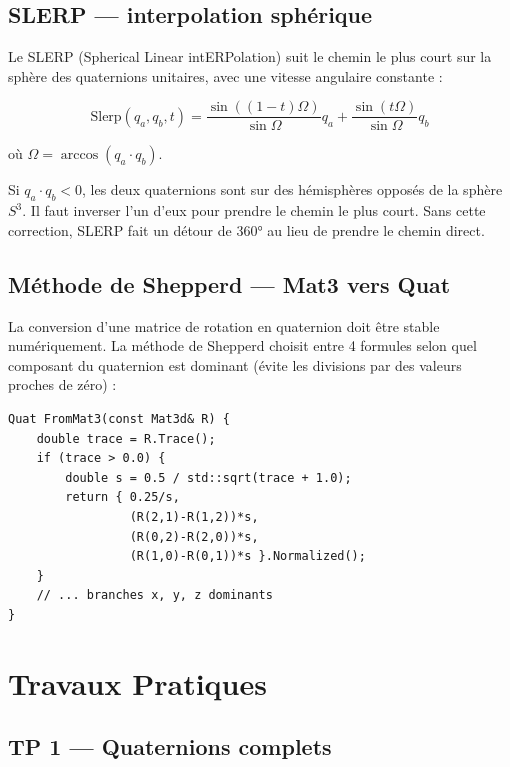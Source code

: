 \documentclass[12pt,a4paper]{report}
\begin{document}
\subsection{SLERP — interpolation sphérique}

Le SLERP (Spherical Linear intERPolation) suit le chemin le plus court sur la sphère des quaternions unitaires, avec une vitesse angulaire constante :

$$
\text{Slerp}(q_a, q_b, t) = \frac{\sin((1-t)\Omega)}{\sin\Omega} q_a + \frac{\sin(t\Omega)}{\sin\Omega} q_b
$$

où $\Omega = \arccos(q_a \cdot q_b)$.

\begin{warnbox}
Si $q_a \cdot q_b < 0$, les deux quaternions sont sur des hémisphères opposés de la sphère $S^3$. Il faut inverser l'un d'eux pour prendre le chemin le plus court. Sans cette correction, SLERP fait un détour de 360° au lieu de prendre le chemin direct.
\end{warnbox}

\subsection{Méthode de Shepperd — Mat3 vers Quat}

La conversion d'une matrice de rotation en quaternion doit être stable numériquement. La méthode de Shepperd choisit entre 4 formules selon quel composant du quaternion est dominant (évite les divisions par des valeurs proches de zéro) :

\begin{lstlisting}[caption={Méthode de Shepperd — branche trace positive}]
Quat FromMat3(const Mat3d& R) {
    double trace = R.Trace();
    if (trace > 0.0) {
        double s = 0.5 / std::sqrt(trace + 1.0);
        return { 0.25/s,
                 (R(2,1)-R(1,2))*s,
                 (R(0,2)-R(2,0))*s,
                 (R(1,0)-R(0,1))*s }.Normalized();
    }
    // ... branches x, y, z dominants
}
\end{lstlisting}

\section{Travaux Pratiques}

\subsection{TP 1 — Quaternions complets}
\end{document}
